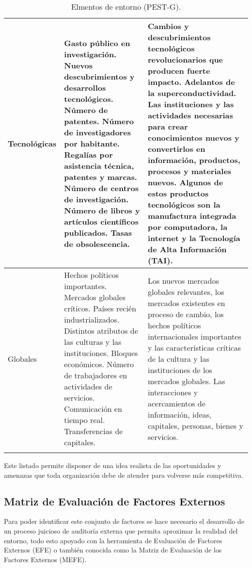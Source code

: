 \begin{longtable}{|m{8em}|m{12em}|m{12em}|}
 \hline 
 Tecnológicas & Gasto público en investigación.\newline
Nuevos descubrimientos y desarrollos tecnológicos.\newline
Número de patentes.\newline
Número de investigadores por habitante.\newline
Regalías por asistencia técnica, patentes y marcas.\newline
Número de centros de investigación.\newline
Número de libros y artículos científicos publicados.\newline
Tasas de obsolescencia. & Cambios y descubrimientos tecnológicos revolucionarios que producen fuerte impacto. Adelantos de la superconductividad. Las instituciones y las actividades necesarias para crear conocimientos nuevos y convertirlos en información, productos, procesos y materiales nuevos. Algunos de estos productos tecnológicos son la manufactura integrada por computadora, la internet y la Tecnología de Alta Información (TAI). \\ 
 \hline 
 Globales & Hechos políticos importantes. \newline
Mercados globales críticos. \newline
Países recién industrializados. \newline
Distintos atributos de las culturas y las instituciones.\newline
Bloques económicos.\newline
Número de trabajadores en actividades de servicios.\newline
Comunicación en tiempo real.\newline
Transferencias de capitales. & Los nuevos mercados globales relevantes, los mercados existentes en proceso de cambio, los hechos políticos internacionales importantes y las características críticas de la cultura y las instituciones de los mercados globales. Las interacciones y acercamientos de información, ideas, capitales, personas, bienes y servicios.
 \\ 
 \hline 
 \caption{Elmentos de entorno (PEST-G).}
 \end{longtable}  
 
Este listado permite disponer de una idea realista de las oportunidades y amenazas que toda organización debe de atender para volverse más competitiva.

\subsection{Matriz de Evaluación de Factores Externos}
Para poder identificar este conjunto de factores se hace necesario el desarrollo de un proceso juicioso de auditoría externa que permita aproximar la realidad del entorno, todo esto apoyado con la herramienta de Evaluación de Factores Externos (EFE) o también conocida como la Matriz de Evaluación de los Factores Externos (MEFE).

